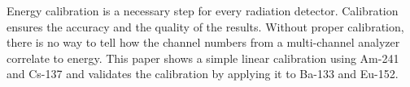 Energy calibration is a necessary step for every radiation detector. Calibration ensures the accuracy and the quality of the results. Without proper calibration, there is no way to tell how the channel numbers from a multi-channel analyzer correlate to energy. This paper shows a simple linear calibration using Am-241 and Cs-137 and validates the calibration by applying it to Ba-133 and Eu-152.
